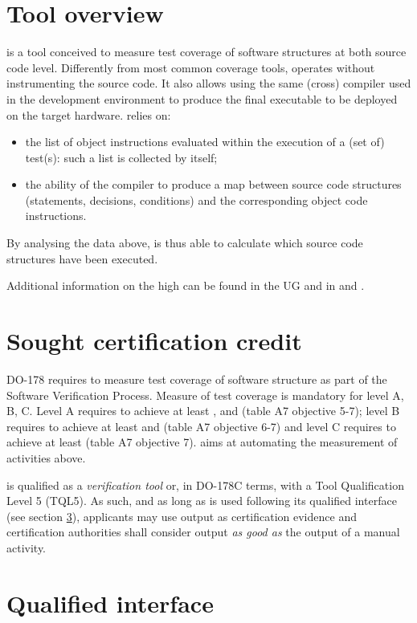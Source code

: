 \documentclass {report}
\begin{document}
\section{Tool overview}
\xcov is a tool conceived to measure test coverage of software structures at both source code level. Differently from most common coverage tools, \xcov operates without instrumenting the source code. It also allows using the same (cross) compiler used in the development environment to produce the final executable to be deployed on the target hardware. \xcov relies on:
\begin{itemize}
\item the list of object instructions evaluated within the execution of a (set of) test(s): such a list is collected by \xcov itself; 
\item the ability of the compiler to produce a map between source code structures (statements, decisions, conditions) and the corresponding object code instructions.
\end{itemize}
By analysing the data above, \xcov is thus able to calculate which source code structures have been executed.

Additional information on the high \xcov can be found in the \xcov UG and in \adaeurope and \erts.

\section {Sought certification credit}
DO-178 requires to measure test coverage of software structure as part of the Software Verification Process. Measure of test coverage is mandatory for level A, B, C. Level A requires to achieve at least \mcdc, \dc and \stc (table A7 objective 5-7); level B requires to achieve at least \dc and \stc (table A7 objective 6-7) and level C requires to achieve at least \stc (table A7 objective 7). \xcov aims at automating the measurement of activities above.

\xcov is qualified as a \emph{verification tool} or, in DO-178C terms, with a Tool Qualification Level 5 (TQL5). As such, and as long as \xcov is used following its qualified interface (see section \ref{sec:qual-interface}), applicants may use \xcov output as certification evidence and certification authorities shall consider \xcov output \emph{as good as} the output of a manual activity.

\section{Qualified interface}
\label{sec:qual-interface}
\end{document}
